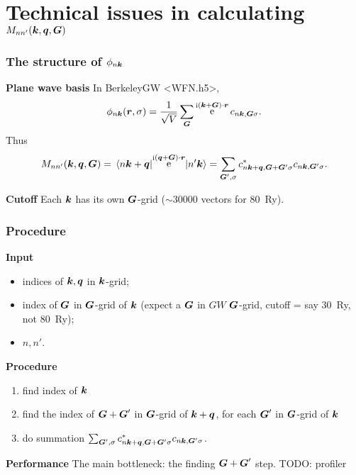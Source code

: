 \documentclass[t]{beamer}
\DeclareMathOperator{\ee}{e}
\DeclareMathOperator{\ii}{i}
\newcommand{\shortcode}[1]{\texttt{#1}}
\def\texttt#1{<#1>}%
\begin{document}
\section{Technical issues in calculating $M_{nn'}(\vb*{k}, \vb*{q}, \vb*{G})$}

\begin{frame}
\frametitle{The structure of $\phi_{n \vb*{k}}$}

\textbf{Plane wave basis} In BerkeleyGW \shortcode{WFN.h5}, 
\begin{equation}
    \phi_{n \vb*{k}}(\vb*{r}, \sigma) = \frac{1}{\sqrt{V}} \sum_{\vb*{G}} \ee^{\ii (\vb*{k} + \vb*{G}) \cdot \vb*{r}} c_{n \vb*{k}, \vb*{G} \sigma}.
\end{equation}    
Thus 
\begin{equation}
    M_{nn'}(\vb*{k}, \vb*{q}, \vb*{G}) 
    = \mel*{n \vb*{k} + \vb*{q}}{\ee^{\ii (\vb*{q} + \vb*{G}) \cdot \vb*{r}}}{n' \vb*{k}} 
    = \sum_{\vb*{G}', \sigma} c^*_{n \vb*{k} + \vb*{q}, \vb*{G} + \vb*{G}' \sigma} c_{n \vb*{k}, \vb*{G}' \sigma}.
\end{equation}

\textbf{Cutoff} Each $\vb*{k}$ has its own $\vb*{G}$-grid ($\sim 30000$ vectors for \SI{80}{Ry}).

\end{frame}

\begin{frame}
\frametitle{Procedure}

\textbf{Input} 
\begin{itemize}
    \item indices of $\vb*{k}, \vb*{q}$ in $\vb*{k}$-grid; 
    \item index of $\vb*{G}$ in $\vb*{G}$-grid of $\vb*{k}$ 
    (expect a $\vb*{G}$ in $GW$ $\vb*{G}$-grid, 
    cutoff = say \SI{30}{Ry}, not \SI{80}{Ry});
    \item $n, n'$.
\end{itemize}

\textbf{Procedure}
\begin{enumerate}
    \item find index of $\vb*{k}$
    \item find the index of $\vb*{G} + \vb*{G}'$ in $\vb*{G}$-grid of $\vb*{k} + \vb*{q}$,
    for each $\vb*{G}'$ in $\vb*{G}$-grid of $\vb*{k}$
    \item do summation $\sum_{\vb*{G}', \sigma} c^*_{n \vb*{k} + \vb*{q}, \vb*{G} + \vb*{G}' \sigma} c_{n \vb*{k}, \vb*{G}' \sigma}$.
\end{enumerate}    

\textbf{Performance} The main bottleneck: the finding $\vb*{G} + \vb*{G}'$ step.
TODO: profiler

\end{frame}
\end{document}
